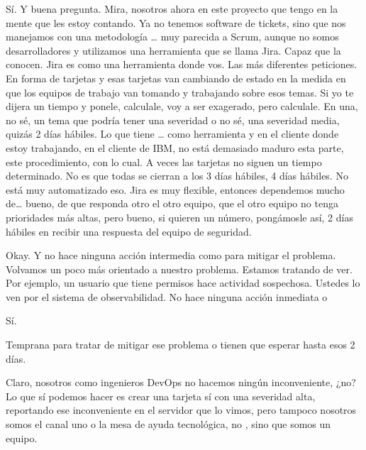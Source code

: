 \begin{description}[leftmargin=0cm, labelsep=0.5cm]
    \item[\textbf{VILLARINO PABLO RODOLFO:}] Sí. Y buena pregunta. Mira, nosotros ahora en este proyecto que tengo en la mente que les estoy contando. Ya no tenemos software de tickets, sino que nos manejamos con una metodología … muy parecida a Scrum, aunque no somos desarrolladores y utilizamos una herramienta que se llama Jira. Capaz que la conocen. Jira es como una herramienta donde vos. Las más diferentes peticiones. En forma de tarjetas y esas tarjetas van cambiando de estado en la medida en que los equipos de trabajo van tomando y trabajando sobre esos temas. Si yo te dijera un tiempo y ponele, calculale, voy a ser exagerado, pero calculale. En una, no sé, un tema que podría tener una severidad o no sé, una severidad media, quizás 2 días hábiles. Lo que tiene … como herramienta y en el cliente donde estoy trabajando, en el cliente de IBM, no está demasiado maduro esta parte, este procedimiento, con lo cual. A veces las tarjetas no siguen un tiempo determinado. No es que todas se cierran a los 3 días hábiles, 4 días hábiles. No está muy automatizado eso. Jira es muy flexible, entonces dependemos mucho de… bueno, de que responda otro el otro equipo, que el otro equipo no tenga prioridades más altas, pero bueno, si quieren un número, pongámosle así, 2 días hábiles en recibir una respuesta del equipo de seguridad.

    \item[\textbf{MOCIULSKY SANTIAGO:}] Okay. Y no hace ninguna acción intermedia como para mitigar el problema. Volvamos un poco más orientado a nuestro problema. Estamos tratando de ver. Por ejemplo, un usuario que tiene permisos hace actividad sospechosa. Ustedes lo ven por el sistema de observabilidad. No hace ninguna acción inmediata o

    \item[\textbf{VILLARINO PABLO RODOLFO:}] Sí.

    \item[\textbf{MOCIULSKY SANTIAGO:}] Temprana para tratar de mitigar ese problema o tienen que esperar hasta esos 2 días.

    \item[\textbf{VILLARINO PABLO RODOLFO:}] Claro, nosotros como ingenieros DevOps no hacemos ningún inconveniente, ¿no? Lo que sí podemos hacer es crear una tarjeta sí con una severidad alta, reportando ese inconveniente en el servidor que lo vimos, pero tampoco nosotros somos el canal uno o la mesa de ayuda tecnológica, no , sino que somos un equipo.


\end{description}
